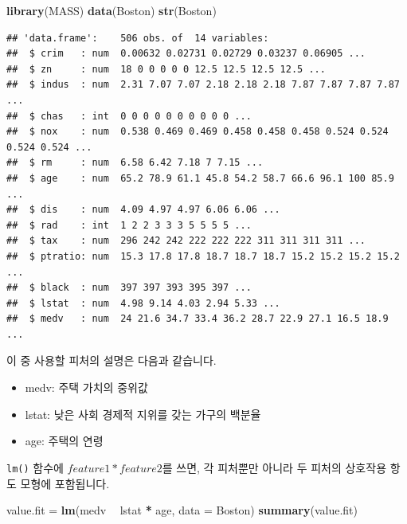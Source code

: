 \documentclass[12pt,]{book}
\newenvironment{Shaded}{\begin{snugshade}}{\end{snugshade}}
\newcommand{\DataTypeTok}[1]{\textcolor[rgb]{0.13,0.29,0.53}{#1}}
\newcommand{\KeywordTok}[1]{\textcolor[rgb]{0.13,0.29,0.53}{\textbf{#1}}}
\newcommand{\NormalTok}[1]{#1}
\newcommand{\OperatorTok}[1]{\textcolor[rgb]{0.81,0.36,0.00}{\textbf{#1}}}
\newcommand{\StringTok}[1]{\textcolor[rgb]{0.31,0.60,0.02}{#1}}
\providecommand{\tightlist}{%
  \setlength{\itemsep}{0pt}\setlength{\parskip}{0pt}}
\begin{document}
\begin{Shaded}
\begin{Highlighting}[]
\KeywordTok{library}\NormalTok{(MASS)}
\KeywordTok{data}\NormalTok{(Boston)}
\KeywordTok{str}\NormalTok{(Boston)}
\end{Highlighting}
\end{Shaded}

\begin{verbatim}
## 'data.frame':    506 obs. of  14 variables:
##  $ crim   : num  0.00632 0.02731 0.02729 0.03237 0.06905 ...
##  $ zn     : num  18 0 0 0 0 0 12.5 12.5 12.5 12.5 ...
##  $ indus  : num  2.31 7.07 7.07 2.18 2.18 2.18 7.87 7.87 7.87 7.87 ...
##  $ chas   : int  0 0 0 0 0 0 0 0 0 0 ...
##  $ nox    : num  0.538 0.469 0.469 0.458 0.458 0.458 0.524 0.524 0.524 0.524 ...
##  $ rm     : num  6.58 6.42 7.18 7 7.15 ...
##  $ age    : num  65.2 78.9 61.1 45.8 54.2 58.7 66.6 96.1 100 85.9 ...
##  $ dis    : num  4.09 4.97 4.97 6.06 6.06 ...
##  $ rad    : int  1 2 2 3 3 3 5 5 5 5 ...
##  $ tax    : num  296 242 242 222 222 222 311 311 311 311 ...
##  $ ptratio: num  15.3 17.8 17.8 18.7 18.7 18.7 15.2 15.2 15.2 15.2 ...
##  $ black  : num  397 397 393 395 397 ...
##  $ lstat  : num  4.98 9.14 4.03 2.94 5.33 ...
##  $ medv   : num  24 21.6 34.7 33.4 36.2 28.7 22.9 27.1 16.5 18.9 ...
\end{verbatim}

이 중 사용할 피처의 설명은 다음과 같습니다.

\begin{itemize}
\tightlist
\item
  medv: 주택 가치의 중위값
\item
  lstat: 낮은 사회 경제적 지위를 갖는 가구의 백분율
\item
  age: 주택의 연령
\end{itemize}

\texttt{lm()} 함수에 \(feature1 * feature2\)를 쓰면, 각 피처뿐만 아니라 두 피처의 상호작용 항도 모형에 포함됩니다.

\begin{Shaded}
\begin{Highlighting}[]
\NormalTok{value.fit =}\StringTok{ }\KeywordTok{lm}\NormalTok{(medv }\OperatorTok{~}\StringTok{ }\NormalTok{lstat }\OperatorTok{*}\StringTok{ }\NormalTok{age, }\DataTypeTok{data =}\NormalTok{ Boston)}
\KeywordTok{summary}\NormalTok{(value.fit)}
\end{Highlighting}
\end{Shaded}
\end{document}
